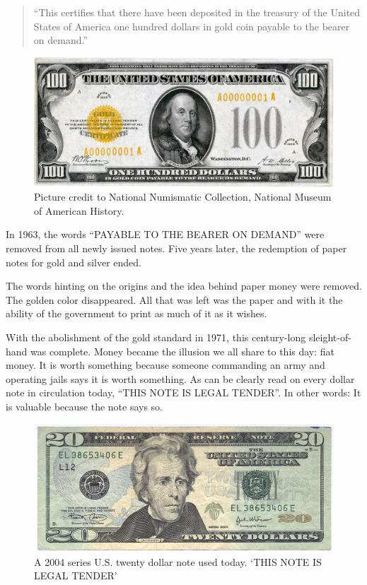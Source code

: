 \begin{samepage}\begin{quotation}
\enquote{This certifies that there have been deposited in the treasury of the
United States of America one hundred dollars in gold coin payable to
the bearer on demand.}
\end{quotation}\end{samepage}

\begin{figure}
  \centering
  \includegraphics{assets/images/us-gold-cert-100-smaller.png}
  \caption{Picture credit to National Numismatic Collection, National Museum of American History.}
  \label{fig:us-gold-cert-100-smaller}
\end{figure}

In 1963, the words \enquote{PAYABLE TO THE BEARER ON DEMAND} were removed from
all newly issued notes. Five years later, the redemption of paper notes
for gold and silver ended.

The words hinting on the origins and the idea behind paper money were
removed. The golden color disappeared. All that was left was the paper
and with it the ability of the government to print as much of it as it
wishes.

With the abolishment of the gold standard in 1971, this century-long
sleight-of-hand was complete. Money became the illusion we all share to
this day: fiat money. It is worth something because someone commanding
an army and operating jails says it is worth something. As can be
clearly read on every dollar note in circulation today, \enquote{THIS NOTE IS
LEGAL TENDER}. In other words: It is valuable because the note says so.

\begin{figure}
  \centering
  \includegraphics{assets/images/us-dollar-2004.jpg}
  \caption{A 2004 series U.S. twenty dollar note used today. `THIS NOTE IS LEGAL TENDER'}
  \label{fig:us-dollar-2004}
\end{figure}

